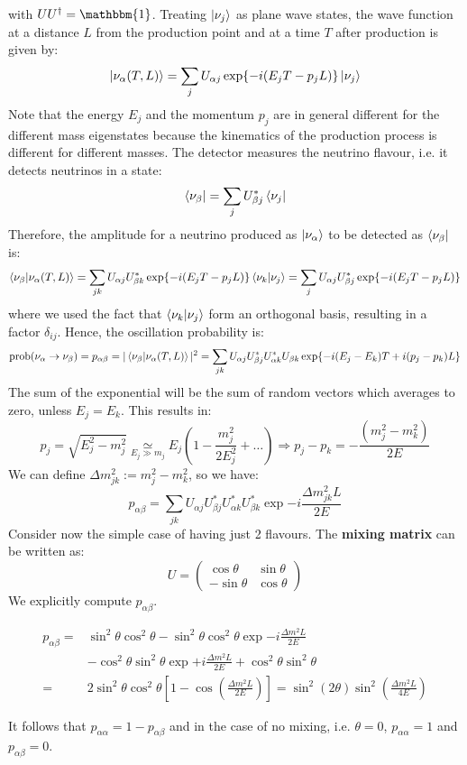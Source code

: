 \documentclass[10.75pt,a4paper,openright,bottom=2cm]{article}
\newcommand{\beginbox}[1]{\begin{tcolorbox}[width=\textwidth,colback={black!40},title={#1},colbacktitle={purple!55},coltitle=black]}
\renewcommand{\endbox}{\end{tcolorbox}\noindent}
\begin{document}
with $UU^\dagger=\mathbbm{1}$. Treating $\ket{\nu_j}$ as plane wave states, the wave function at a distance
$L$ from the production point and at a time $T$ after production is given by:
\[
\ket{\nu_\alpha(T,L)}=\sum_jU_{\alpha j}\exp{-i(E_jT-p_jL)}\ket{\nu_j}
\]
Note that the energy $E_j$ and the momentum $p_j$ are in general different for the different
mass eigenstates because the kinematics of the production process is different for different
masses. The detector measures the neutrino flavour, i.e. it detects neutrinos in a state:
\[
\bra{\nu_\beta}=\sum_jU_{\beta j}^*\bra{\nu_j}
\]
Therefore, the amplitude for a neutrino produced as $\ket{\nu_\alpha}$ to be detected as $\bra{\nu_\beta}$ is:
\[
\braket{\nu_\beta}{\nu_\alpha(T,L)}=\sum_{jk}U_{\alpha j}U_{\beta k}^*\exp{-i(E_jT-p_jL)}\braket{\nu_k}{\nu_j}=\sum_jU_{\alpha j}U_{\beta j}^*\exp{-i(E_jT-p_jL)}
\]
where we used the fact that $\braket{\nu_k}{\nu_j}$ form an orthogonal basis, resulting in a factor $\delta_{ij}$. Hence, the oscillation probability is:
\[
\text{prob}(\nu_\alpha\to\nu_\beta)=p_{\alpha\beta}=|\braket{\nu_\beta}{\nu_\alpha(T,L)}|^2=\sum_{jk}U_{\alpha j}U_{\beta j}^*U_{\alpha k}^*U_{\beta k}\exp{-i(E_j-E_k)T+i(p_j-p_k)L}
\]
The sum of the exponential will be the sum of random vectors which averages to zero, unless $E_j=E_k$. This results in:
\[
p_j=\sqrt{E_j^2-m_j^2}\underset{E_j\gg m_j}{\simeq}E_j\left(1-\frac{m_j^2}{2E_j^2}+\dots\right)\Rightarrow p_j-p_k=-\frac{(m_j^2-m_k^2)}{2E}
\]
We can define $\Delta m_{jk}^2:=m_j^2-m_k^2$, so we have:
\[
p_{\alpha\beta}=\sum_{jk}U_{\alpha j}U_{\beta j}^*U_{\alpha k}^*U_{\beta k}^*\exp{-i\frac{\Delta m_{jk}^2L}{2E}}
\]
Consider now the simple case of having just 2 flavours. The \textbf{mixing matrix} can be written as:
\[
U=\left(\begin{array}{cc}
    \cos\theta & \sin\theta \\
    -\sin\theta & \cos\theta
\end{array}\right)
\]
We explicitly compute $p_{\alpha\beta}$.
\beginbox{Oscillation Probability in the Vacuum}
\begin{align*}
p_{\alpha\beta}=&\sin^2\theta\cos^2\theta-\sin^2\theta\cos^2\theta\exp{-i\frac{\Delta m^2L}{2E}}\\
&-\cos^2\theta\sin^2\theta\exp{+i\frac{\Delta m^2L}{2E}}+\cos^2\theta\sin^2\theta\\
=&2\sin^2\theta\cos^2\theta\left[1-\cos\left(\frac{\Delta m^2L}{2E}\right)\right]=\sin^2(2\theta)\sin^2\left(\frac{\Delta m^2L}{4E}\right)
\end{align*}
\endbox
It follows that $p_{\alpha\alpha}=1-p_{\alpha\beta}$ and in the case of no mixing, i.e. $\theta=0$, $p_{\alpha\alpha}=1$ and $p_{\alpha\beta}=0$.
\end{document}
